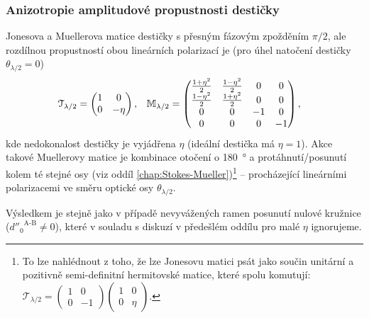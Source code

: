\subsubsection*{Anizotropie amplitudové propustnosti destičky}
Jonesova a Muellerova matice destičky s přesným fázovým zpožděním $\pi/2$, ale rozdílnou propustností obou lineárních polarizací je (pro úhel natočení destičky $\theta_{\lambda/2}=0$)
\begin{align}
    \mathcal{T}_{\lambda/2} &= \begin{pmatrix} 1&0 \\ 0&-\eta \end{pmatrix} , &
    \mathbb{M}_{\lambda/2} &= \begin{pmatrix} \frac{1+\eta^2}{2}&\frac{1-\eta^2}{2}&0&0 \\ \frac{1-\eta^2}{2}&\frac{1+\eta^2}{2}&0&0 \\ 0&0&-1&0 \\ 0&0&0&-1 \end{pmatrix} ,
\end{align}
kde nedokonalost destičky je vyjádřena $\eta$ (ideální destička má $\eta=1$).
Akce takové Muellerovy matice je kombinace otočení o \SI{180}{\degree} a protáhnutí/posunutí kolem té stejné osy (viz oddíl \ref{chap:Stokes-Mueller})\footnote{To lze nahlédnout z toho, že lze Jonesovu matici psát jako součin unitární a pozitivně semi-definitní hermitovské matice, které spolu komutují: $\mathcal{T}_{\lambda/2} = \begin{pmatrix} 1&0\\0&-1 \end{pmatrix} \begin{pmatrix} 1&0\\0&\eta \end{pmatrix}$.} -- procházející lineárními polarizacemi ve směru optické osy $\theta_{\lambda/2}$.

Výsledkem je stejně jako v případě nevyvážených ramen posunutí nulové kružnice (${d''_0}^\textrm{A-B}\neq0$), které v souladu s diskuzí v předešlém oddílu pro malé $\eta$ ignorujeme.

